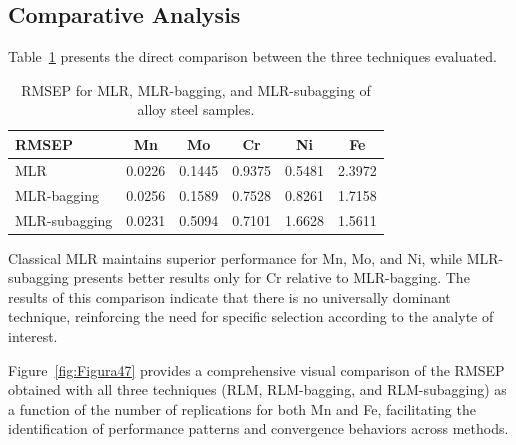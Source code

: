 \documentclass[12pt]{article}
\begin{document}
\subsection{Comparative Analysis}

Table~\ref{tab:comparison} presents the direct comparison between the three techniques evaluated.

\begin{table}[H]
\centering
\caption{RMSEP for MLR, MLR-bagging, and MLR-subagging of alloy steel samples.}
\label{tab:comparison}
\begin{tabular}{lccccc}
\toprule
RMSEP & Mn & Mo & Cr & Ni & Fe \\
\midrule
MLR & 0.0226 & 0.1445 & 0.9375 & 0.5481 & 2.3972 \\
MLR-bagging & 0.0256 & 0.1589 & 0.7528 & 0.8261 & 1.7158 \\
MLR-subagging & 0.0231 & 0.5094 & 0.7101 & 1.6628 & 1.5611 \\
\bottomrule
\end{tabular}
\end{table}

Classical MLR maintains superior performance for Mn, Mo, and Ni, while MLR-subagging presents better results only for Cr relative to MLR-bagging. The results of this comparison indicate that there is no universally dominant technique, reinforcing the need for specific selection according to the analyte of interest.

Figure~\ref{fig:Figura47} provides a comprehensive visual comparison of the RMSEP obtained with all three techniques (RLM, RLM-bagging, and RLM-subagging) as a function of the number of replications for both Mn and Fe, facilitating the identification of performance patterns and convergence behaviors across methods.
\end{document}
